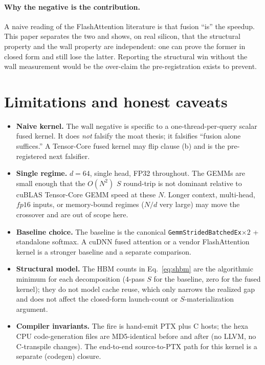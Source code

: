 \documentclass[11pt,a4paper]{article}
\newcommand{\verdict}[1]{\texttt{#1}}
\begin{document}
\paragraph{Why the negative is the contribution.}
A naive reading of the FlashAttention literature is that fusion ``is'' the
speedup. This paper separates the two and shows, on real silicon, that the
structural property and the wall property are independent: one can prove the
former in closed form and still lose the latter. Reporting the structural win
without the wall measurement would be the over-claim the pre-registration exists
to prevent.

\section{Limitations and honest caveats}
\label{sec:limits}

\begin{itemize}\itemsep0.3em
\item \textbf{Naive kernel.} The wall negative is specific to a
  one-thread-per-query scalar fused kernel. It does \emph{not} falsify the moat
  thesis; it falsifies ``fusion alone suffices.'' A Tensor-Core fused kernel may
  flip clause (b) and is the pre-registered next falsifier.
\item \textbf{Single regime.} $d{=}64$, single head, FP32 throughout. The GEMMs
  are small enough that the $O(N^2)$ $S$ round-trip is not dominant relative to
  cuBLAS Tensor-Core GEMM speed at these $N$. Longer context, multi-head, $fp16$
  inputs, or memory-bound regimes ($N/d$ very large) may move the crossover and
  are out of scope here.
\item \textbf{Baseline choice.} The baseline is the canonical
  \verdict{GemmStridedBatchedEx}$\times 2$ + standalone softmax. A cuDNN fused
  attention or a vendor FlashAttention kernel is a stronger baseline and a
  separate comparison.
\item \textbf{Structural model.} The HBM counts in Eq.~\eqref{eq:shbm} are the
  algorithmic minimum for each decomposition (4-pass $S$ for the baseline,
  zero for the fused kernel); they do not model cache reuse, which only narrows
  the realized gap and does not affect the closed-form launch-count or
  $S$-materialization argument.
\item \textbf{Compiler invariants.} The fire is hand-emit PTX plus C hosts; the
  hexa CPU code-generation files are MD5-identical before and after (no LLVM,
  no C-transpile changes). The end-to-end source-to-PTX path for this kernel is
  a separate (codegen) closure.
\end{itemize}
\end{document}

